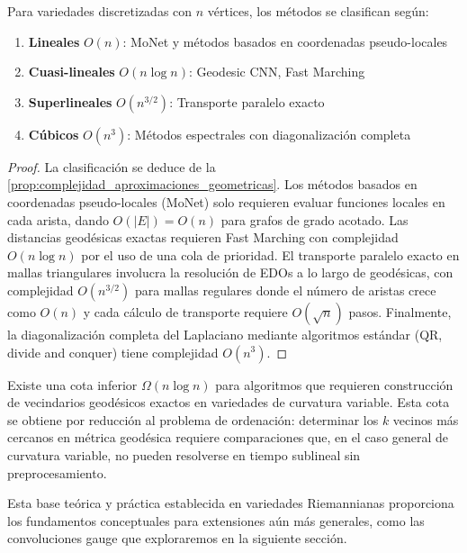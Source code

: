 \begin{proposition}\label{prop:jerarquia_complejidades}
Para variedades discretizadas con $n$ vértices, los métodos se clasifican según:
\begin{enumerate}
    \item \textbf{Lineales} $O(n)$: MoNet y métodos basados en coordenadas pseudo-locales
    \item \textbf{Cuasi-lineales} $O(n \log n)$: Geodesic CNN, Fast Marching
    \item \textbf{Superlineales} $O(n^{3/2})$: Transporte paralelo exacto
    \item \textbf{Cúbicos} $O(n^3)$: Métodos espectrales con diagonalización completa
\end{enumerate}
\end{proposition}

\begin{proof}
La clasificación se deduce de la \autoref{prop:complejidad_aproximaciones_geometricas}. Los métodos basados en coordenadas pseudo-locales (MoNet) solo requieren evaluar funciones locales en cada arista, dando $O(|E|) = O(n)$ para grafos de grado acotado. Las distancias geodésicas exactas requieren Fast Marching con complejidad $O(n \log n)$ por el uso de una cola de prioridad. El transporte paralelo exacto en mallas triangulares involucra la resolución de EDOs a lo largo de geodésicas, con complejidad $O(n^{3/2})$ para mallas regulares donde el número de aristas crece como $O(n)$ y cada cálculo de transporte requiere $O(\sqrt{n})$ pasos. Finalmente, la diagonalización completa del Laplaciano mediante algoritmos estándar (QR, divide and conquer) tiene complejidad $O(n^3)$.
\end{proof}

\begin{remark}
Existe una cota inferior $\Omega(n \log n)$ para algoritmos que requieren construcción de vecindarios geodésicos exactos en variedades de curvatura variable. Esta cota se obtiene por reducción al problema de ordenación: determinar los $k$ vecinos más cercanos en métrica geodésica requiere comparaciones que, en el caso general de curvatura variable, no pueden resolverse en tiempo sublineal sin preprocesamiento.
\end{remark}

Esta base teórica y práctica establecida en variedades Riemannianas proporciona los fundamentos conceptuales para extensiones aún más generales, como las convoluciones gauge que exploraremos en la siguiente sección.

